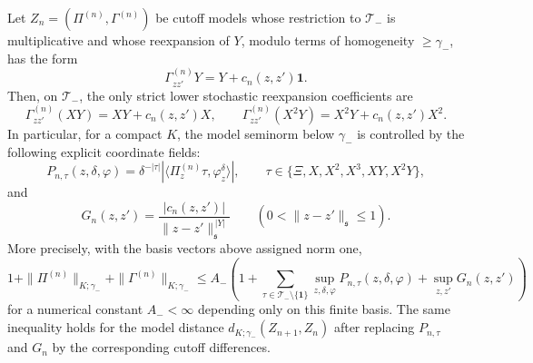 \begin{lemma}
Let \(Z_n=(\Pi^{(n)},\Gamma^{(n)})\) be cutoff models whose restriction to
\(\mathcal T_-\) is multiplicative and whose reexpansion of \(Y\), modulo
terms of homogeneity \(\geq\gamma_-\), has the form
\begin{equation}
  \Gamma_{zz'}^{(n)}Y
  =
  Y+c_n(z,z')\mathbf 1 .
  \label{eq:spde-y-reexpansion-coefficient}
\end{equation}
Then, on \(\mathcal T_-\), the only strict lower stochastic reexpansion
coefficients are
\begin{equation}
  \Gamma_{zz'}^{(n)}(XY)
  =
  XY+c_n(z,z')X,
  \qquad
  \Gamma_{zz'}^{(n)}(X^2Y)
  =
  X^2Y+c_n(z,z')X^2 .
  \label{eq:spde-negative-sector-gamma-coordinates}
\end{equation}
In particular, for a compact \(K\), the model seminorm below
\(\gamma_-\) is controlled by the following explicit coordinate fields:
\[
  P_{n,\tau}(z,\delta,\varphi)
  =
  \delta^{-|\tau|}
  \left|
    \langle\Pi_z^{(n)}\tau,\varphi_z^\delta\rangle
  \right|,
  \qquad
  \tau\in\{\Xi,X,X^2,X^3,XY,X^2Y\},
\]
and
\[
  G_n(z,z')
  =
  \frac{|c_n(z,z')|}
       {\|z-z'\|_{\mathfrak s}^{\,|Y|}}
  \qquad
  (0<\|z-z'\|_{\mathfrak s}\leq1).
\]
More precisely, with the basis vectors above assigned norm one,
\begin{equation}
  1+\|\Pi^{(n)}\|_{K;\gamma_-}+\|\Gamma^{(n)}\|_{K;\gamma_-}
  \leq
  A_-
  \left(
    1+
    \sum_{\tau\in\mathcal T_-\setminus\{\mathbf 1\}}
    \sup_{z,\delta,\varphi} P_{n,\tau}(z,\delta,\varphi)
    +
    \sup_{z,z'}G_n(z,z')
  \right)
  \label{eq:spde-negative-sector-coordinate-domination}
\end{equation}
for a numerical constant \(A_-<\infty\) depending only on this finite basis.
The same inequality holds for the model distance
\(d_{K;\gamma_-}(Z_{n+1},Z_n)\) after replacing \(P_{n,\tau}\) and \(G_n\)
by the corresponding cutoff differences.
\end{lemma}

